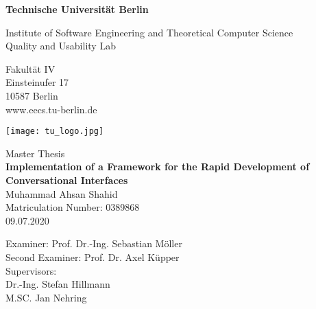 \thispagestyle{empty}
\begin{center}

\vspace*{1cm}
{\LARGE \textbf{Technische Universität Berlin}}

\vspace{0.5cm}

{\large Institute of Software Engineering and Theoretical Computer Science\\[1mm]}
{\large Quality and Usability Lab\\[5mm]}

Fakultät IV\\
Einsteinufer 17\\
10587 Berlin\\
www.eecs.tu-berlin.de\\

\vspace*{0.8cm}

\texttt{[image: tu\_logo.jpg]}

\vspace*{0.8cm}

{\LARGE Master Thesis}\\

\vspace{0.8cm}
{\LARGE \textbf{Implementation of a Framework for the Rapid Development of Conversational Interfaces}}\\
\vspace*{1.0cm}
{\LARGE Muhammad Ahsan Shahid}
\\
\vspace*{0.5cm}
Matriculation Number: 0389868\\
09.07.2020\\  %
\vspace*{0.8cm}

Examiner: Prof. Dr.-Ing. Sebastian Möller\\
\vspace*{0.4cm}
Second Examiner: Prof. Dr. Axel Küpper\\
\vspace*{0.4cm}
Supervisors:\\
Dr.-Ing. Stefan Hillmann\\
M.SC. Jan Nehring
\vspace*{0.4cm}




\end{center}
